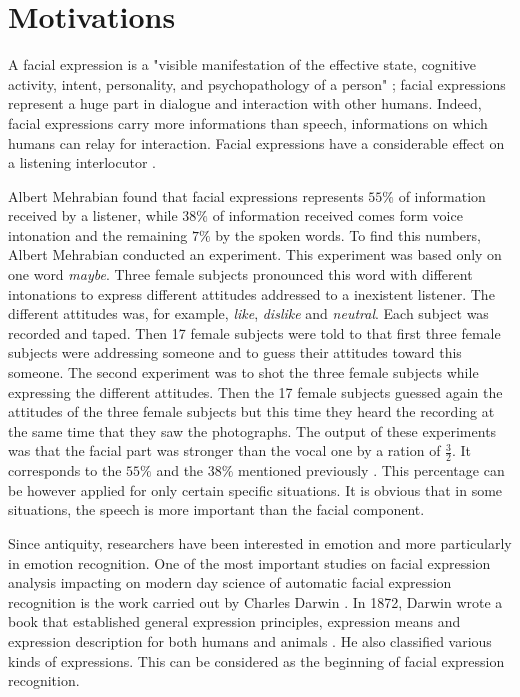 \chapter{Motivations}
\label{ch:motivations}

\noindent A facial expression is a "visible manifestation of the effective state, cognitive activity, intent, personality, and psychopathology of a person" \cite{DON99}; facial expressions represent a huge part in dialogue and interaction with other humans. Indeed, facial expressions carry more informations than speech, informations on which humans can relay for interaction. Facial expressions have a considerable effect on a listening interlocutor \cite{PAN00}. 
\newline

\noindent Albert Mehrabian found that facial expressions represents $ 55\% $ of information received by a listener, while $ 38\% $ of information received comes form voice intonation and the remaining $ 7\% $ by the spoken words. To find this numbers, Albert Mehrabian conducted an experiment. This experiment was based only on one word \textit{maybe}. Three female subjects pronounced this word with different intonations to express different attitudes addressed to a inexistent listener. The different attitudes was, for example, \textit{like}, \textit{dislike} and \textit{neutral}. Each subject was recorded and taped. Then 17 female subjects were told to that first three female subjects were addressing someone and to guess their attitudes toward this someone. The second experiment was to shot the three female subjects while expressing the different attitudes. Then the 17 female subjects guessed again the attitudes of the three female subjects but this time they heard the recording at the same time that they saw the photographs. The output of these experiments was that the facial part was stronger than the vocal one by a ration of $ \frac{3}{2} $. It corresponds to the $ 55\% $ and the $ 38\% $ mentioned previously \cite{PAN00}. This percentage can be however applied for only certain specific situations. It is obvious that in some situations, the speech is more important than the facial component.
\newline

\noindent Since antiquity, researchers have been interested in emotion and more particularly in emotion recognition. One of the most important studies on facial expression analysis impacting on modern day science of automatic facial expression recognition is the work carried out by Charles Darwin \cite{BET12}. In 1872, Darwin wrote a book that established general expression principles, expression means and expression description for both humans and animals \cite{DAR04}. He also classified various kinds of expressions. This can be considered as the beginning of facial expression recognition.
\newline


